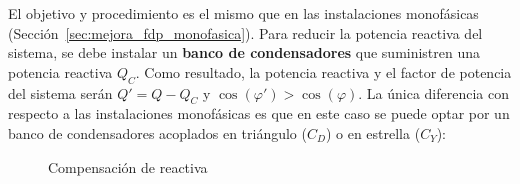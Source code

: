 El objetivo y procedimiento es el mismo que en las instalaciones
monofásicas (Sección~\ref{sec:mejora_fdp_monofasica}). Para reducir la
potencia reactiva del sistema, se debe instalar un \textbf{banco de
  condensadores} que suministren una potencia reactiva $Q_C$. Como
resultado, la potencia reactiva y el factor de potencia del sistema
serán $Q' = Q - Q_C$ y $\cos(\varphi') > \cos (\varphi)$. La única
diferencia con respecto a las instalaciones monofásicas es que en este
caso se puede optar por un banco de condensadores acoplados en
triángulo ($C_D$) o en estrella ($C_Y$):
\begin{figure}[H]
  \centering
  \hfil
  \caption{Compensación de reactiva}
\end{figure}
